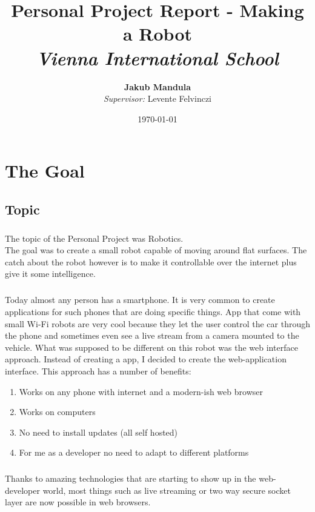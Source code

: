 \documentclass[12pt,a4paper]{report}
\author{\textbf{Jakub Mandula} \\ \textit{Supervisor:} Levente Felvinczi}
\title{\textbf{Personal Project Report - Making a Robot} \\ \textit{Vienna International School}
}
\date{\today \bigskip \endgraf{\textbf{Words:} 3504}}
\begin{document}
\maketitle

\pagebreak
{} 
\setcounter{page}{2}


\tableofcontents
\pagebreak
\chapter{The Goal}

\section{Topic}

\paragraph{}
The topic of the Personal Project was Robotics.
\\
The goal was to create a small robot capable of moving around flat surfaces. The catch about the robot however is to make it controllable over the internet plus give it some intelligence.

\paragraph{}
Today almost any person has a smartphone. It is very common to create applications for such phones that are doing specific things. App that come with small Wi-Fi robots are very cool because they let the user control the car through the phone and sometimes even see a live stream from a camera mounted to the vehicle. What was supposed to be different on this robot was the web interface approach. Instead of creating a app, I decided to create the web-application interface. This approach has a number of benefits:

\begin{enumerate}
	\item Works on any phone with internet and a modern-ish web browser
	\item Works on computers
	\item No need to install updates (all self hosted)
	\item For me as a developer no need to adapt to different platforms
\end{enumerate}

\paragraph{}
Thanks to amazing technologies that are starting to show up in the web-developer world, most things such as live streaming or two way secure socket layer are now possible in web browsers.
\end{document}
